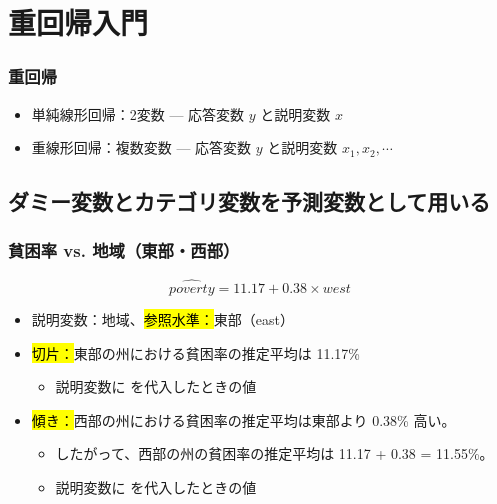 
\section{重回帰入門}


\begin{frame}
\frametitle{重回帰}

\begin{itemize}

\item 単純線形回帰：2変数 --- 応答変数 $y$ と説明変数 $x$

\item 重線形回帰：複数変数 --- 応答変数 $y$ と説明変数 $x_1, x_2, \cdots$

\end{itemize}

\end{frame}


\subsection{ダミー変数とカテゴリ変数を予測変数として用いる}


\begin{frame}
\frametitle{貧困率 vs. 地域（東部・西部）}


\[ \widehat{poverty} = 11.17 + 0.38 \times west \]

\begin{itemize}

\item 説明変数：地域、\hl{参照水準：}東部（east）

\item \hl{切片：}東部の州における貧困率の推定平均は 11.17\%
\begin{itemize}
\item 説明変数に  を代入したときの値
\end{itemize}

\item \hl{傾き：}西部の州における貧困率の推定平均は東部より 0.38\% 高い。
\begin{itemize}
\item したがって、西部の州の貧困率の推定平均は 11.17 + 0.38 = 11.55\%。
\item 説明変数に  を代入したときの値
\end{itemize}

\end{itemize}

\end{frame}

